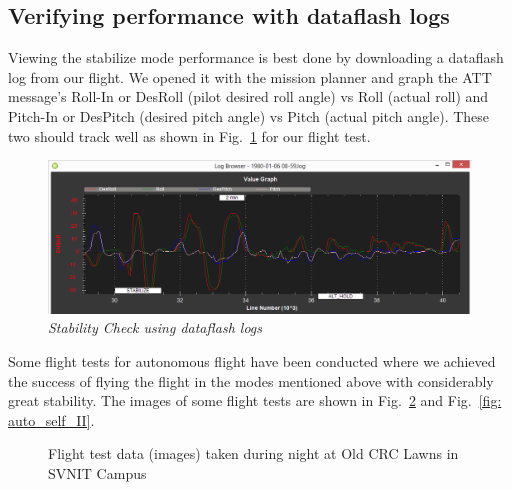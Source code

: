 \subsection{Verifying performance with dataflash logs}
Viewing the stabilize mode performance is best done by downloading a dataflash log from our flight. We opened it with the mission planner and graph the ATT message’s Roll-In or DesRoll (pilot desired roll angle) vs Roll (actual roll) and Pitch-In or DesPitch (desired pitch angle) vs Pitch (actual pitch angle). These two should track well as shown in Fig.~\ref{fig: Tuning_StabilizeCheck} for our flight test.
\begin{figure}[h]
	\includegraphics[width=1.0\linewidth]{Tuning_StabilizeCheck}
	\centering
	\caption{\label{fig: Tuning_StabilizeCheck}\textit{Stability Check using dataflash logs}}
\end{figure}

Some flight tests for autonomous flight have been conducted where we achieved the success of flying the flight in the modes mentioned above with considerably great stability. The images of some flight tests are shown in Fig.~\ref{fig: auto_self_I} and Fig.~\ref{fig: auto_self_II}.


\begin{figure}[h]
	\hfill
	\hfill
	\hfill
	\caption{\label{fig: auto_self_I}Flight test data (images) taken during night at Old CRC Lawns in SVNIT Campus}
\end{figure}

